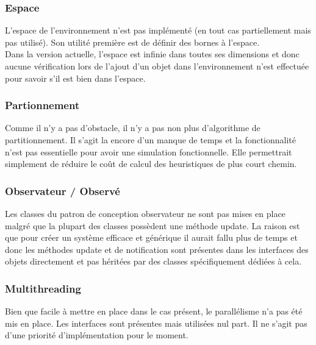 \subsubsection{Espace}
L'espace de l'environnement n'est pas implémenté (en tout cas partiellement mais pas utilisé). Son utilité première est de définir des bornes à l'espace.\\
Dans la version actuelle, l'espace est infinie dans toutes ses dimensions et donc aucune vérification lors de l'ajout d'un objet dans l'environnement n'est effectuée pour savoir s'il est bien dans l'espace.

\subsubsection{Partionnement}
Comme il n'y a pas d'obstacle, il n'y a pas non plus d'algorithme de partitionnement. Il s'agit la encore d'un manque de temps et la fonctionnalité n'est pas essentielle pour avoir une simulation fonctionnelle. Elle permettrait simplement de réduire le coût de calcul des heuristiques de plus court chemin.

\subsubsection{Observateur / Observé}

Les classes du patron de conception observateur ne sont pas mises en place malgré que la plupart des classes possèdent une méthode update. La raison est que pour créer un système efficace et générique il aurait fallu plus de temps et donc les méthodes update et de notification sont présentes dans les interfaces des objets directement et pas héritées par des classes spécifiquement dédiées à cela.

\subsubsection{Multithreading}
Bien que facile à mettre en place dans le cas présent, le parallélisme n'a pas été mis en place. Les interfaces sont présentes mais utilisées nul part. Il ne s'agit pas d'une priorité d'implémentation pour le moment.
